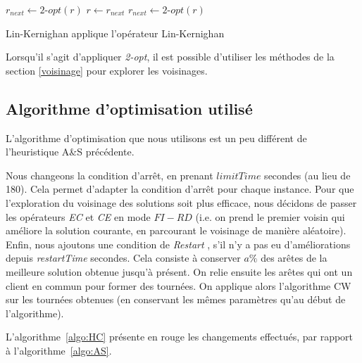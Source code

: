 \documentclass[a4paper,11pt]{article}%
\begin{document}
\begin{algorithm}
\DontPrintSemicolon %
$r_{next} \gets 2$-$opt(r) $\;
 {
  $r \gets r_{next}$\;
  $r_{next} \gets 2$-$opt(r)$\;
}
\;
\caption{{\sc Lin-Kernighan} applique l'opérateur Lin-Kernighan}
\label{algo:LK}
\end{algorithm}

Lorsqu'il s'agit d'appliquer \emph{2-opt}, il est possible d'utiliser les méthodes de la section \ref{voisinage} pour explorer les voisinages.

\subsection{Algorithme d'optimisation utilisé}
L'algorithme d'optimisation que nous utilisons est un peu différent de l'heuristique A\&S précédente.

Nous changeons la condition d'arrêt, en prenant $limitTime$ secondes (au lieu de 180). Cela permet d'adapter la condition d'arrêt pour chaque instance. 
Pour que l'exploration du voisinage des solutions soit plus efficace, nous décidons de passer les opérateurs \emph{EC} et \emph{CE} en mode $FI-RD$ (i.e. on prend le premier voisin qui améliore la solution courante, en parcourant le voisinage de manière aléatoire).
Enfin, nous ajoutons une condition de \emph{Restart} , s'il n'y a pas eu d'améliorations depuis \emph{restartTime} secondes. 
Cela consiste à conserver $a\%$ des arêtes de la meilleure solution obtenue jusqu'à présent. On relie ensuite les arêtes qui ont un client en commun pour former des tournées.
On applique alors l'algorithme CW sur les tournées obtenues (en conservant les mêmes paramètres qu'au début de l'algorithme).

L'algorithme~\ref{algo:HC} présente en rouge les changements effectués, par rapport à l'algorithme~\ref{algo:AS}.
\end{document}

